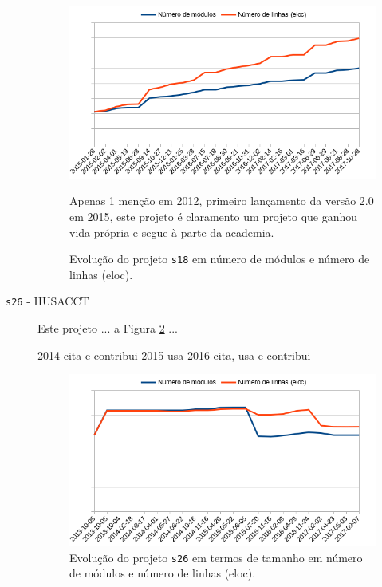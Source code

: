 \begin{description}
\begin{figure}[h]
  \centering
  \begin{minipage}{0.6\textwidth}
    \includegraphics[scale=0.6]{imagens/modules-eloc-s18.png}
  \end{minipage}
  \begin{minipage}{0.25\textwidth}
    {\small Apenas 1 menção em 2012, primeiro lançamento da versão 2.0 em 2015,
    este projeto é claramento um projeto que ganhou vida própria e segue à
    parte da academia.}
  \end{minipage}
  \caption{Evolução do projeto \texttt{s18} em número de módulos e número de linhas (eloc).}
  \label{modules-eloc-s18}
\end{figure}

  \item[\texttt{s26} - HUSACCT]
    Este projeto ... a Figura \ref{modules-eloc-s26} ...

2014	cita e contribui
2015	usa
2016	cita, usa e contribui

\begin{figure}[h]
  \centering
  \includegraphics[scale=0.6]{imagens/modules-eloc-s26.png}
  \caption{Evolução do projeto \texttt{s26} em termos de tamanho em número de módulos e número de linhas (eloc).}
  \label{modules-eloc-s26}
\end{figure}


\end{description}
